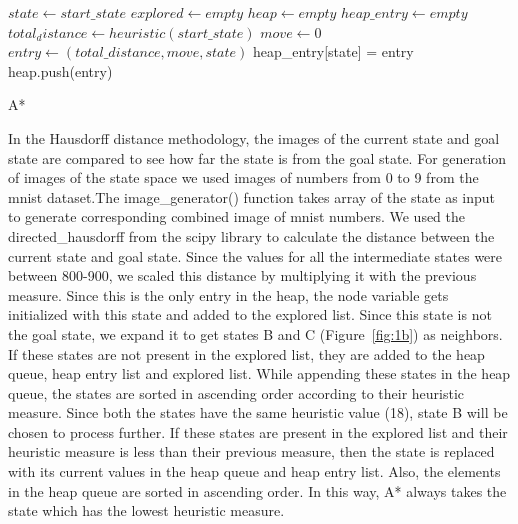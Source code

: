 \documentclass{svproc}
\begin{document}
\begin{algorithm}[H]
	\SetAlgoLined
	$state \gets start\_state$\;
	$explored \gets empty$\;
	$heap \gets empty$\;
	$heap\_entry \gets empty$\;
	$total_distance \gets heuristic(start\_state)$\;
	$move \gets 0$\;
	$entry \gets (total\_distance, move, state)$\;
	heap\_entry[state] = entry\;
	heap.push(entry)\;
	\caption{A*}
	\label{algo:3}
\end{algorithm}

\noindent  In the Hausdorff distance methodology, the images of the current state and goal state are compared to see how far the state is from the goal state. For generation of images of the state space we used images of numbers from 0 to 9 from the mnist  dataset.The image\_generator() function takes array of the state as input to generate corresponding combined image of mnist numbers. We used the directed\_hausdorff from the scipy library to calculate the distance between the current state and goal state. Since the values for all the intermediate states were between 800-900, we scaled this distance by multiplying it with the previous measure. Since this is the only entry in the heap, the node variable gets initialized with this state and added to the explored list. Since this state is not the goal state, we expand it to get states B and C (Figure~\ref{fig:1b}) as neighbors. If these states are not present in the explored list, they are added to the heap queue, heap entry list and explored list. While appending these states in the heap queue, the states are sorted in ascending order according to their heuristic measure. Since both the states have the same heuristic value (18), state B will be chosen to process further. If these states are present in the explored list and their heuristic measure is less than their previous measure, then the state is replaced with its current values in the heap queue and heap entry list. Also, the elements in the heap queue are sorted in ascending order. In this way, A* always takes the state which has the lowest heuristic measure. 
\end{document}
